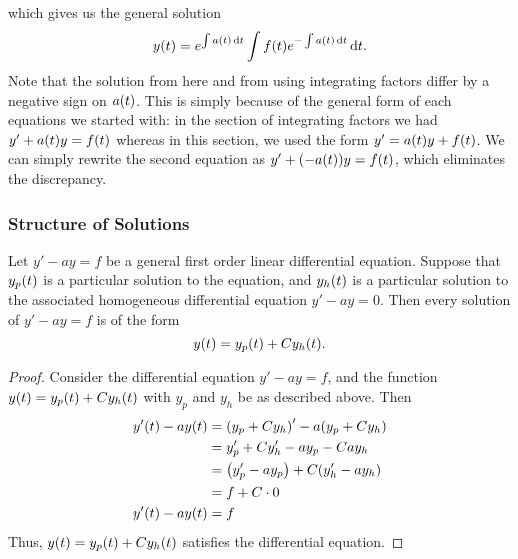 which gives us the general solution \[ y\p{t} = e^{\int a\p{t} \, \diff{t}} \int f\p{t}e^{-\int a\p{t} \, \diff{t}} \, \diff{t}. \] Note that the solution from here and from using integrating factors differ by a negative sign on $a\p{t}$. This is simply because of the general form of each equations we started with: in the section of integrating factors we had $y' + a\p{t}y = f\p{t}$ whereas in this section, we used the form $y' = a\p{t}y + f\p{t}$. We can simply rewrite the second equation as $y' + \p{-a\p{t}}y = f\p{t}$, which eliminates the discrepancy.
\subsubsection{Structure of Solutions}
\begin{theorem}
	Let $y' - ay = f$ be a general first order linear differential equation. Suppose that $y_p\p{t}$ is a particular solution to the equation, and $y_h\p{t}$ is a particular solution to the associated homogeneous differential equation $y' - ay = 0$. Then every solution of $y' - ay = f$ is of the form \[ y\p{t} = y_p\p{t} + Cy_h\p{t}. \]
\end{theorem}
\begin{proof}
	Consider the differential equation $y' - ay = f$, and the function $y\p{t} = y_p\p{t} + Cy_h\p{t}$ with $y_p$ and $y_h$ be as described above. Then
	\begin{align*}
		y'\p{t} - ay\p{t} &= \p{y_p + Cy_h}' - a\p{y_p + Cy_h} \\
								  &= y_p' + Cy_h' - ay_p - Cay_h \\
								  &= \p{y_p' - ay_p} + C\p{y_h' - ay_h} \\
								  &= f + C \cdot 0 \\
		y'\p{t} - ay\p{t} &= f
	\end{align*}
	Thus, $y\p{t} = y_p\p{t} + Cy_h\p{t}$ satisfies the differential equation.
\end{proof}
